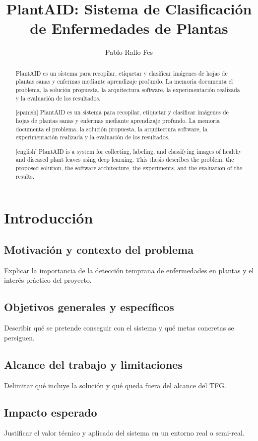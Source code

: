 \documentclass[11pt,spanish,listoffigures,listoftables]{tfgetsinf}
\title{PlantAID: Sistema de Clasificación de Enfermedades de Plantas}
\author{Pablo Rallo Fes}
\begin{document}
\begin{abstract}
PlantAID es un sistema para recopilar, etiquetar y clasificar imágenes de hojas de plantas sanas y enfermas mediante aprendizaje profundo. La memoria documenta el problema, la solución propuesta, la arquitectura software, la experimentación realizada y la evaluación de los resultados.
\end{abstract}

\begin{abstract}[spanish]
PlantAID es un sistema para recopilar, etiquetar y clasificar imágenes de hojas de plantas sanas y enfermas mediante aprendizaje profundo. La memoria documenta el problema, la solución propuesta, la arquitectura software, la experimentación realizada y la evaluación de los resultados.
\end{abstract}

\begin{abstract}[english]
PlantAID is a system for collecting, labeling, and classifying images of healthy and diseased plant leaves using deep learning. This thesis describes the problem, the proposed solution, the software architecture, the experiments, and the evaluation of the results.
\end{abstract}

\mainmatter

\chapter{Introducción}
\section{Motivación y contexto del problema}
Explicar la importancia de la detección temprana de enfermedades en plantas y el interés práctico del proyecto.

\section{Objetivos generales y específicos}
Describir qué se pretende conseguir con el sistema y qué metas concretas se persiguen.

\section{Alcance del trabajo y limitaciones}
Delimitar qué incluye la solución y qué queda fuera del alcance del TFG.

\section{Impacto esperado}
Justificar el valor técnico y aplicado del sistema en un entorno real o semi-real.
\end{document}
